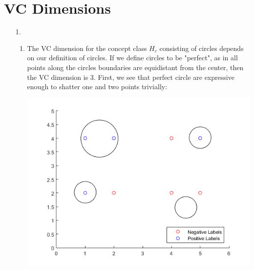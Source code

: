 \documentclass[11pt,a4paper]{article}
\begin{document}
	\section{VC Dimensions}
		\begin{itemize}
			\item [1.]
				\begin{enumerate} [label={\alph*)}]
					\item  The VC dimension for the concept class $H_c$ consisting of circles depends on our definition of circles. If we define circles to be "perfect", as in all points along the circles boundaries are equidistant from the center, then the VC dimension is 3. First, we see that perfect circle are expressive enough to shatter one and two points trivially:
					\begin{center}
						\includegraphics[width=1\linewidth]{q3a}
					\end{center}
					

\end{enumerate}
\end{itemize}
\end{document}
